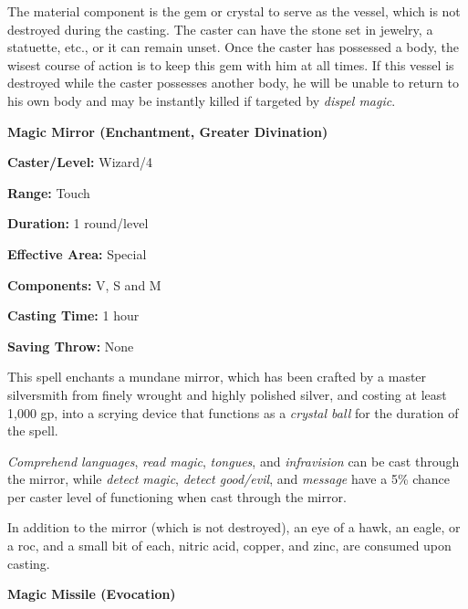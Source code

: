 \begin{multicols}{2}
The material component is the gem or crystal to serve as the vessel, which is not destroyed during the casting.  The caster can have the stone set in jewelry, a statuette, etc., or it can remain unset.  Once the caster has possessed a body, the wisest course of action is to keep this gem with him at all times.  If this vessel is destroyed while the caster possesses another body, he will be unable to return to his own body and may be instantly killed if targeted by \textit{dispel magic}.

\vspace{1em}

\noindent
\begin{minipage}{\columnwidth}

\noindent \textbf{Magic Mirror (Enchantment, Greater Divination)}

\noindent \textbf{Caster/Level:} Wizard/4

\noindent \textbf{Range:} Touch

\noindent \textbf{Duration:} 1 round/level

\noindent \textbf{Effective Area:} Special

\noindent \textbf{Components:} V, S and M

\noindent \textbf{Casting Time:} 1 hour

\noindent \textbf{Saving Throw:} None

\end{minipage}

This spell enchants a mundane mirror, which has been crafted by a master silversmith from finely wrought and highly polished silver, and costing at least 1,000 gp, into a scrying device that functions as a \textit{crystal ball} for the duration of the spell.  

\textit{Comprehend languages}, \textit{read magic}, \textit{tongues}, and \textit{infravision} can be cast through the mirror, while \textit{detect magic}, \textit{detect good/evil}, and \textit{message} have a 5\% chance per caster level of functioning when cast through the mirror.

In addition to the mirror (which is not destroyed), an eye of a hawk, an eagle, or a roc, and a small bit of each, nitric acid, copper, and zinc, are consumed upon casting.

\vspace{1em}

\noindent
\begin{minipage}{\columnwidth}

\noindent \textbf{Magic Missile (Evocation)}


\end{minipage}
\end{multicols}
